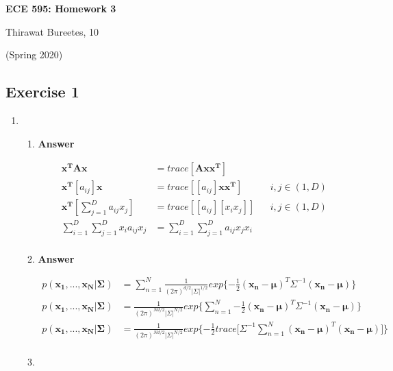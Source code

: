 \documentclass[11pt]{article}
\begin{document}
\begin{center}
\Large{\textbf{ECE 595: Homework 3}}

Thirawat Bureetes, 10

(Spring 2020)
\end{center}

\subsection*{Exercise 1}

\begin{enumerate}[label=(\alph*)]

\item 

\begin{enumerate}[label=(\roman*)]

\item 

\noindent\textbf{Answer}

\begin{align*}
\mathbf{x^T}\mathbf{A}\mathbf{x}&= trace[\mathbf{Axx^T}]\\
\mathbf{x^T}[a_{ij}]\mathbf{x}&= trace[[a_{ij}]\mathbf{xx^T}]  && \text{$i, j \in (1,D)$}\\
\mathbf{x^T}[\sum_{j=1}^D{a_{ij}x_j}]&= trace[[a_{ij}][x_ix_j]]  && \text{$i, j \in (1,D)$}\\
\sum_{i=1}^D\sum_{j=1}^D{x_ia_{ij}x_j}&= \sum_{i=1}^D\sum_{j=1}^D{a_{ij}x_jx_i}  \\
\end{align*}

\item 

\noindent\textbf{Answer}

\begin{align*}
p(\mathbf{x_1,...,x_N|\Sigma}) &= \sum_{n=1}^N{\frac{1}{(2\pi)^{d/2}|\Sigma|^{1/2}}exp{\{-\frac{1}{2}}(\mathbf{x_n-\mu})^T\Sigma^{-1}(\mathbf{x_n-\mu})\}}\\
p(\mathbf{x_1,...,x_N|\Sigma}) &= \frac{1}{(2\pi)^{Nd/2}|\Sigma|^{N/2}}exp{\{}\sum_{n=1}^N{-\frac{1}{2}{(\mathbf{x_n-\mu})^T\Sigma^{-1}(\mathbf{x_n-\mu})}\}}\\
p(\mathbf{x_1,...,x_N|\Sigma}) &= \frac{1}{(2\pi)^{Nd/2}|\Sigma|^{N/2}}exp{\{-\frac{1}{2}}trace[\Sigma^{-1}\sum_{n=1}^N{{(\mathbf{x_n-\mu})^T(\mathbf{x_n-\mu})}]\}}\\
\end{align*}

\item 


\end{enumerate}
\end{enumerate}
\end{document}
